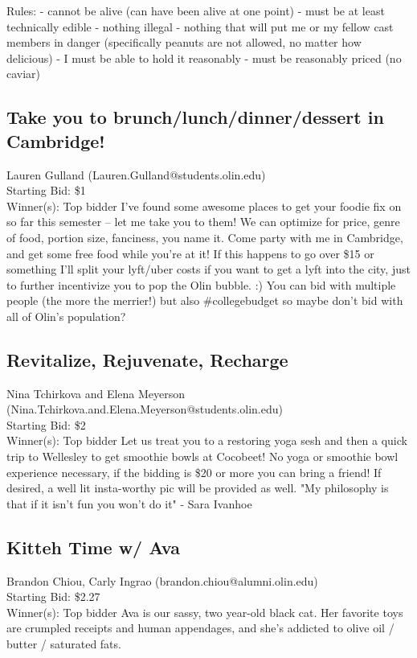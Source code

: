\documentclass[11pt]{article}
\begin{document}
Rules:
- cannot be alive (can have been alive at one point)
- must be at least technically edible
- nothing illegal
- nothing that will put me or my fellow cast members in danger (specifically peanuts are not allowed, no matter how delicious)
- I must be able to hold it reasonably
- must be reasonably priced (no caviar)
\subsection{Take you to brunch/lunch/dinner/dessert in Cambridge!}
Lauren Gulland (Lauren.Gulland@students.olin.edu) \\
Starting Bid: \$1 \\
Winner(s): 
Top bidder\newline
I've found some awesome places to get your foodie fix on so far this semester -- let me take you to them! We can optimize for price, genre of food, portion size, fanciness, you name it. Come party with me in Cambridge, and get some free food while you're at it! 
If this happens to go over \$15 or something I'll split your lyft/uber costs if you want to get a lyft into the city, just to further incentivize you to pop the Olin bubble. :) You can bid with multiple people (the more the merrier!) but also \#collegebudget so maybe don't bid with all of Olin's population?
\subsection{Revitalize, Rejuvenate, Recharge }
Nina Tchirkova and Elena Meyerson (Nina.Tchirkova.and.Elena.Meyerson@students.olin.edu) \\
Starting Bid: \$2 \\
Winner(s): 
Top bidder\newline
Let us treat you to a restoring yoga sesh and then a quick trip to Wellesley to get smoothie bowls at Cocobeet! 
No yoga or smoothie bowl experience necessary, if the bidding is \$20 or more you can bring a friend! If desired, a well lit insta-worthy pic will be provided as well. 
"My philosophy is that if it isn't fun you won't do it" - Sara Ivanhoe
\subsection{Kitteh Time w/ Ava}
Brandon Chiou, Carly Ingrao (brandon.chiou@alumni.olin.edu) \\
Starting Bid: \$2.27 \\
Winner(s): 
Top bidder\newline
Ava is our sassy, two year-old black cat. Her favorite toys are crumpled receipts and human appendages, and she's addicted to olive oil / butter / saturated fats.
\end{document}
